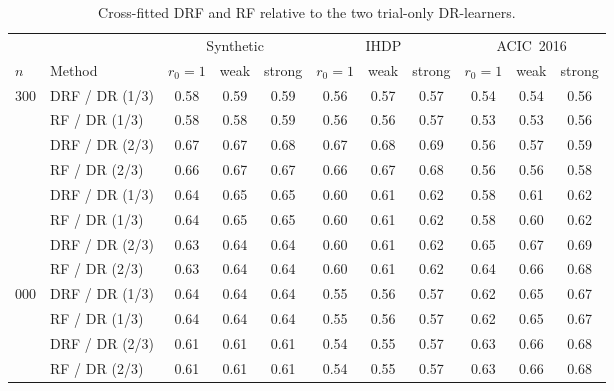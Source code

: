 \begin{table}[h]
\caption{Cross-fitted DRF and RF relative to the two trial-only DR-learners.}
\label{tab:cate-cf}
\begin{center}\footnotesize
\begin{tabular}{@{}llccccccccc@{}}
\toprule
& & \multicolumn{3}{c}{Synthetic} & \multicolumn{3}{c}{IHDP} & \multicolumn{3}{c}{ACIC~2016}\\
\cmidrule(lr){3-5}\cmidrule(lr){6-8}\cmidrule(lr){9-11}
$n$ & Method & $r_0{=}1$ & weak & strong & $r_0{=}1$ & weak & strong & $r_0{=}1$ & weak & strong\\
\midrule
300 & DRF / DR (1/3) & 0.58 & 0.59 & 0.59 & 0.56 & 0.57 & 0.57 & 0.54 & 0.54 & 0.56 \\
 & RF / DR (1/3) & 0.58 & 0.58 & 0.59 & 0.56 & 0.56 & 0.57 & 0.53 & 0.53 & 0.56 \\
 & DRF / DR (2/3) & 0.67 & 0.67 & 0.68 & 0.67 & 0.68 & 0.69 & 0.56 & 0.57 & 0.59 \\
 & RF / DR (2/3) & 0.66 & 0.67 & 0.67 & 0.66 & 0.67 & 0.68 & 0.56 & 0.56 & 0.58 \\
\addlinespace
900 & DRF / DR (1/3) & 0.64 & 0.65 & 0.65 & 0.60 & 0.61 & 0.62 & 0.58 & 0.61 & 0.62 \\
 & RF / DR (1/3) & 0.64 & 0.65 & 0.65 & 0.60 & 0.61 & 0.62 & 0.58 & 0.60 & 0.62 \\
 & DRF / DR (2/3) & 0.63 & 0.64 & 0.64 & 0.60 & 0.61 & 0.62 & 0.65 & 0.67 & 0.69 \\
 & RF / DR (2/3) & 0.63 & 0.64 & 0.64 & 0.60 & 0.61 & 0.62 & 0.64 & 0.66 & 0.68 \\
\addlinespace
3{,}000 & DRF / DR (1/3) & 0.64 & 0.64 & 0.64 & 0.55 & 0.56 & 0.57 & 0.62 & 0.65 & 0.67 \\
 & RF / DR (1/3) & 0.64 & 0.64 & 0.64 & 0.55 & 0.56 & 0.57 & 0.62 & 0.65 & 0.67 \\
 & DRF / DR (2/3) & 0.61 & 0.61 & 0.61 & 0.54 & 0.55 & 0.57 & 0.63 & 0.66 & 0.68 \\
 & RF / DR (2/3) & 0.61 & 0.61 & 0.61 & 0.54 & 0.55 & 0.57 & 0.63 & 0.66 & 0.68 \\
\bottomrule
\end{tabular}
\end{center}
\end{table}
